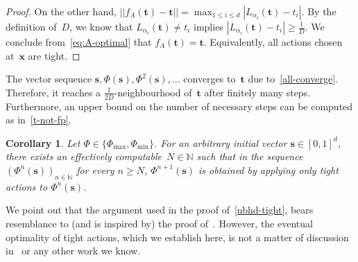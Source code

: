 \documentclass[preprint,12pt]{elsarticle}
\theoremstyle{plain}
\newtheorem{corollary}[theorem]{Corollary}
\theoremstyle{definition}
\theoremstyle{remark}
\theoremstyle{claimstyle}
\newcommand{\NN}{\mathbb{N}}
\begin{document}
\begin{proof}
On the other hand, $
||f_A(\bm{t}) - \bm{t}|| = \max_{1 \leq i \leq d} |L_{\alpha_i}(\bm{t}) - t_i|$.
By the definition of~$D$, we know that $L_{\alpha_i}(\bm{t}) \neq t_i$ implies $|L_{\alpha_i}(\bm{t}) - t_i| \geq \frac{1}{D}$.
We conclude from~\cref{eq:A-optimal} that $f_A(\bm{t}) = \bm{t}$.
Equivalently, all actions chosen at~$\bm{x}$ are tight.
\end{proof}

The vector sequence $\bm{s}, \Phi(\bm{s}), \Phi^2(\bm{s}), \dots$ converges to~$\bm{t}$ due to~\cref{all-converge}. Therefore, it reaches a $\frac{1}{2D}$-neighbourhood of~$\bm{t}$ after finitely many steps.
Furthermore, an upper bound on the number of necessary steps can be computed as in~\cref{t-not-fp}.
\begin{corollary}\label{event-tight}
Let $\Phi \in \{\Phi_{\max},\Phi_{\min}\}$.
For an arbitrary initial vector $\bm{s} \in [0,1]^d$, there exists an effectively computable~$N \in \NN$ such that in the sequence $(\Phi^n(\bm{s}))_{n\in \NN}$
for every $n \geq N$, $\Phi^{n+1}(\bm{s})$ is obtained by applying only tight actions to $\Phi^n(\bm{s})$.
\end{corollary}
We point out that the argument used in the proof of~\cref{nbhd-tight},
bears resemblance to (and is inspired by) the proof of~\cite[Theorem~3]{HaddadM18}.
However, the eventual optimality of tight actions,
which we establish here,
is not a matter of discussion in~\cite{HaddadM18} or any other work we know.
\end{document}
